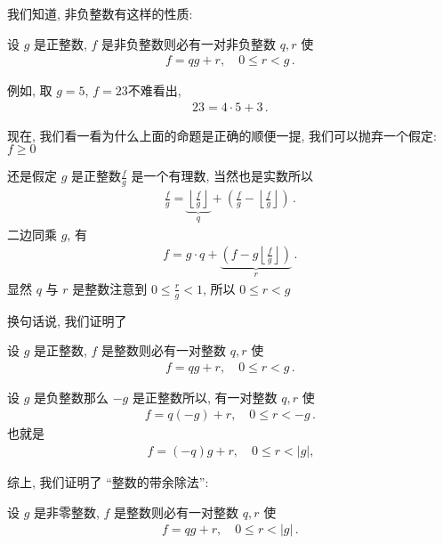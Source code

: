 我们知道, 非负整数有这样的性质:

\begin{proposition}
    设 $g$ 是正整数, $f$ 是非负整数\period 则必有一对非负整数 $q,r$ 使
    \begin{align*}
        f = qg + r, \quad 0 \leq r < g \period
    \end{align*}
\end{proposition}

例如, 取 $g=5$, $f=23$\period 不难看出,
\begin{align*}
    23 = 4 \cdot 5 + 3 \period
\end{align*}

现在, 我们看一看为什么上面的命题是正确的\period 顺便一提, 我们可以抛弃一个假定: $f \geq 0$\period

还是假定 $g$ 是正整数\period $\frac{f}{g}$ 是一个有理数, 当然也是实数\period 所以
\begin{align*}
    \frac{f}{g} = \underbrace{\left\lfloor \frac{f}{g} \right\rfloor}_{q} + \left( \frac{f}{g} - \left\lfloor \frac{f}{g} \right\rfloor \right) \period
\end{align*}
二边同乘 $g$, 有
\begin{align*}
    f = g \cdot q + \underbrace{\left( f - g\left\lfloor \frac{f}{g} \right\rfloor \right)}_{r} \period
\end{align*}
显然 $q$ 与 $r$ 是整数\period 注意到 $0 \leq \frac{r}{g} < 1$, 所以 $0 \leq r < g$\period

换句话说, 我们证明了
\begin{proposition}
    设 $g$ 是正整数, $f$ 是整数\period 则必有一对整数 $q,r$ 使
    \begin{align*}
        f = qg + r, \quad 0 \leq r < g \period
    \end{align*}
\end{proposition}

设 $g$ 是负整数\period 那么 $-g$ 是正整数\period 所以, 有一对整数 $q,r$ 使
\begin{align*}
    f = q(-g) + r, \quad 0 \leq r < -g \period
\end{align*}
也就是
\begin{align*}
    f = (-q)g + r, \quad 0 \leq r < |g|,
\end{align*}

综上, 我们证明了 ``整数的带余除法'':
\begin{proposition}
    设 $g$ 是非零整数, $f$ 是整数\period 则必有一对整数 $q,r$ 使
    \begin{align*}
        f = qg + r, \quad 0 \leq r < |g| \period
    \end{align*}
\end{proposition}


